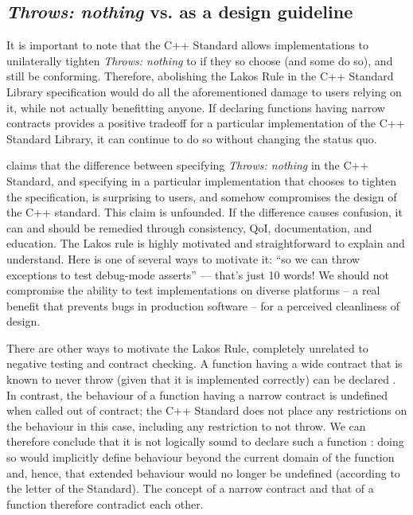 \subsection{\emph{Throws: nothing} vs.  as a design guideline}

It is important to note that the C++ Standard allows implementations to unilaterally tighten \emph{Throws: nothing} to  if they so choose (and some do so), and still be conforming. Therefore, abolishing the Lakos Rule in the C++ Standard Library specification would do all the aforementioned damage to users relying on it, while not actually benefitting anyone. If declaring functions having narrow contracts  provides a positive tradeoff for a particular implementation of the C++ Standard Library, it can continue to do so without changing the status quo.

\cite{P1656R2} claims that the difference between specifying \emph{Throws: nothing} in the C++ Standard, and specifying  in a particular implementation that chooses to tighten the specification, is surprising to users, and somehow compromises the design of the C++ standard. This claim is unfounded. If the difference causes confusion, it can and should be remedied through consistency, QoI, documentation, and education. The Lakos rule is highly motivated and straightforward to explain and understand. Here is one of several ways to motivate it: ``so we can throw exceptions to test debug-mode asserts'' --- that's just 10 words! We should not compromise the ability to test implementations on diverse platforms -- a real benefit that prevents bugs in production software -- for a perceived cleanliness of design.

There are other ways to motivate the Lakos Rule, completely unrelated to negative testing and contract checking. A function having a wide contract that is known to never throw (given that it is implemented correctly) can be declared . In contrast, the behaviour of a function having a narrow contract is undefined when called out of contract; the C++ Standard does not place any restrictions on the behaviour in this case, including any restriction to not throw. We can therefore conclude that it is not logically sound to declare such a function : doing so would implicitly define behaviour beyond the current domain of the function and, hence, that extended behaviour would no longer be undefined (according to the letter of the Standard). The concept of a narrow contract and that of a  function therefore contradict each other.

